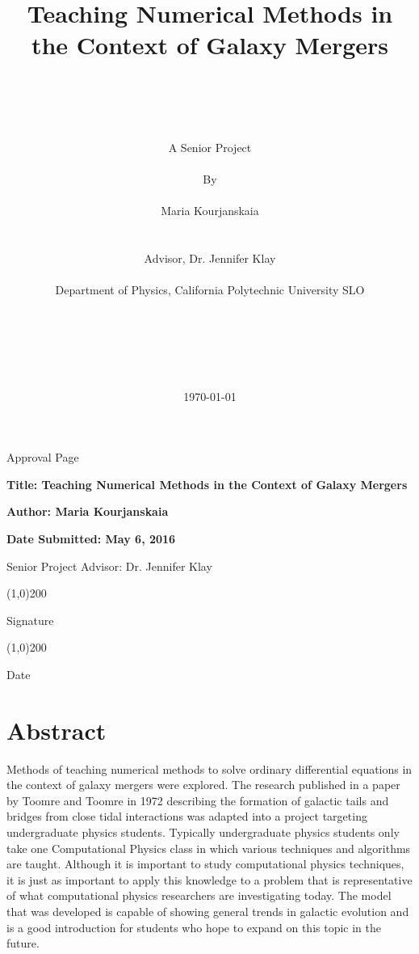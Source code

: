 \documentclass[11pt]{article}
\title{Teaching Numerical Methods in the Context of Galaxy Mergers}
\author
{\\
\\
\\
\\
A Senior Project
\\
\\
By
\\
\\
Maria Kourjanskaia
\\
\\
\\ 
\normalsize{Advisor, Dr. Jennifer Klay}
\\
\\
\normalsize{Department of Physics, California Polytechnic University SLO}\\
\\
\\
\\
\\
\\
}
\date{\today}
\begin{document}
\baselineskip21pt
\maketitle


\newpage

\begin{center}Approval Page\end{center}
\bigskip

\begin{flushleft}
\textbf{Title: Teaching Numerical Methods in the Context of Galaxy Mergers}
\medskip

\textbf{Author: Maria Kourjanskaia}
\medskip

\textbf{Date Submitted: May 6, 2016}
\end{flushleft}

\bigskip
\bigskip
\bigskip
\bigskip
\bigskip
\bigskip
\bigskip
\bigskip
\bigskip
\bigskip
\bigskip
\bigskip
\bigskip
\bigskip
\bigskip
\bigskip
\bigskip
\bigskip
\bigskip


\begin{flushright}
Senior Project Advisor: Dr. Jennifer Klay

\bigskip
\bigskip


\line(1,0){200}

Signature
\bigskip

\line(1,0){200}

Date



\end{flushright}




\newpage

\tableofcontents

\listoftables

\listoffigures

\newpage

\section{Abstract}
Methods of teaching numerical methods to solve ordinary differential equations in the context of galaxy mergers were explored. The research published in a paper by Toomre and Toomre in 1972 describing the formation of galactic tails and bridges from close tidal interactions was adapted into a project targeting undergraduate physics students. Typically undergraduate physics students only take one Computational Physics class in which various techniques and algorithms are taught. Although it is important to study computational physics techniques, it is just as important to apply this knowledge to a problem that is representative of what computational physics researchers are investigating today. The model that was developed is capable of showing general trends in galactic evolution and is a good introduction for students who hope to expand on this topic in the future.
\end{document}
